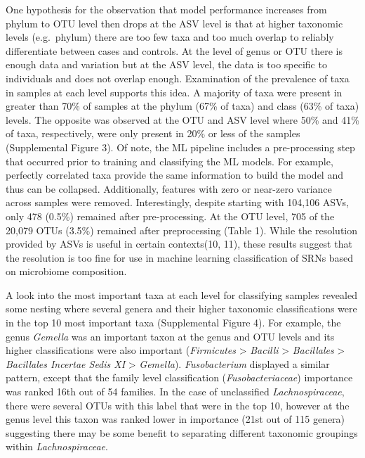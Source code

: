 \documentclass[
]{article}
\begin{document}
One hypothesis for the observation that model performance increases from
phylum to OTU level then drops at the ASV level is that at higher
taxonomic levels (e.g.~phylum) there are too few taxa and too much
overlap to reliably differentiate between cases and controls. At the
level of genus or OTU there is enough data and variation but at the ASV
level, the data is too specific to individuals and does not overlap
enough. Examination of the prevalence of taxa in samples at each level
supports this idea. A majority of taxa were present in greater than 70\%
of samples at the phylum (67\% of taxa) and class (63\% of taxa) levels.
The opposite was observed at the OTU and ASV level where 50\% and 41\%
of taxa, respectively, were only present in 20\% or less of the samples
(Supplemental Figure 3). Of note, the ML pipeline includes a
pre-processing step that occurred prior to training and classifying the
ML models. For example, perfectly correlated taxa provide the same
information to build the model and thus can be collapsed. Additionally,
features with zero or near-zero variance across samples were removed.
Interestingly, despite starting with 104,106 ASVs, only 478 (0.5\%)
remained after pre-processing. At the OTU level, 705 of the 20,079 OTUs
(3.5\%) remained after preprocessing (Table 1). While the resolution
provided by ASVs is useful in certain contexts(10, 11), these results
suggest that the resolution is too fine for use in machine learning
classification of SRNs based on microbiome composition.

A look into the most important taxa at each level for classifying
samples revealed some nesting where several genera and their higher
taxonomic classifications were in the top 10 most important taxa
(Supplemental Figure 4). For example, the genus \emph{Gemella} was an
important taxon at the genus and OTU levels and its higher
classifications were also important (\emph{Firmicutes} \textgreater{}
\emph{Bacilli} \textgreater{} \emph{Bacillales} \textgreater{}
\emph{Bacillales Incertae Sedis XI} \textgreater{} \emph{Gemella}).
\emph{Fusobacterium} displayed a similar pattern, except that the family
level classification (\emph{Fusobacteriaceae}) importance was ranked
16th out of 54 families. In the case of unclassified
\emph{Lachnospiraceae}, there were several OTUs with this label that
were in the top 10, however at the genus level this taxon was ranked
lower in importance (21st out of 115 genera) suggesting there may be
some benefit to separating different taxonomic groupings within
\emph{Lachnospiraceae}.
\end{document}
